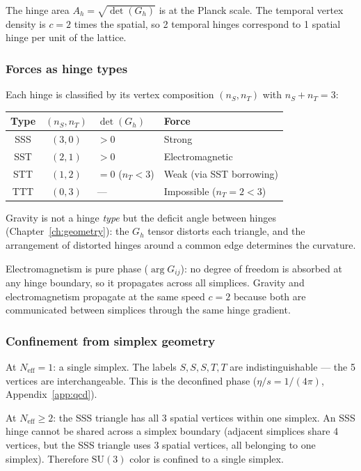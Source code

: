The hinge area $A_h = \sqrt{\det(G_h)}$ is at the Planck scale. The temporal vertex density is $c = 2$ times the spatial, so 2 temporal hinges correspond to 1 spatial hinge per unit of the lattice.

\subsubsection{Forces as hinge types}

Each hinge is classified by its vertex composition $(n_S, n_T)$ with $n_S + n_T = 3$:

\begin{center}
\begin{tabular}{ccll}
\hline
Type & $(n_S, n_T)$ & $\det(G_h)$ & Force \\
\hline
SSS & $(3,0)$ & $> 0$ & Strong \\
SST & $(2,1)$ & $> 0$ & Electromagnetic \\
STT & $(1,2)$ & $= 0$ ($n_T < 3$) & Weak (via SST borrowing) \\
TTT & $(0,3)$ & --- & Impossible ($n_T = 2 < 3$) \\
\hline
\end{tabular}
\end{center}

Gravity is not a hinge \emph{type} but the deficit angle between hinges (Chapter~\ref{ch:geometry}): the $G_h$ tensor distorts each triangle, and the arrangement of distorted hinges around a common edge determines the curvature.

Electromagnetism is pure phase ($\arg G_{ij}$): no degree of freedom is absorbed at any hinge boundary, so it propagates across all simplices. Gravity and electromagnetism propagate at the same speed $c = 2$ because both are communicated between simplices through the same hinge gradient.

\subsubsection{Confinement from simplex geometry}

At $N_\text{eff} = 1$: a single simplex. The labels $S, S, S, T, T$ are indistinguishable --- the 5 vertices are interchangeable. This is the deconfined phase ($\eta/s = 1/(4\pi)$, Appendix~\ref{app:qcd}).

At $N_\text{eff} \geq 2$: the SSS triangle has all 3 spatial vertices within one simplex. An SSS hinge cannot be shared across a simplex boundary (adjacent simplices share 4 vertices, but the SSS triangle uses 3 spatial vertices, all belonging to one simplex). Therefore $\text{SU}(3)$ color is confined to a single simplex.

